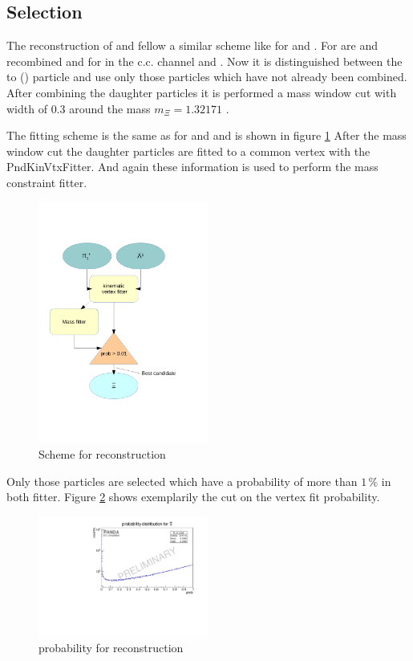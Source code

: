 	\subsection*{Selection}
		The reconstruction of \cascade and \anticascade fellow a similar scheme like for \lam and \alam.
		For \anticascade are \alam and \piplusone recombined and for \cascade in the c.c. channel \lam and \piminusone.
		Now it is distinguished between the to \piplus (\piminus) particle and use only those particles which have not already been combined.
		After combining the daughter particles it is performed a mass window cut with width of $0.3$\massunit 
		around the \cascade mass $m_{\Xi} = 1.32171$ \massunit \cite{PDG}.
		 
		The fitting scheme is the same as for \lam and \alam and is shown in figure \ref{fig:anticascade_scheme} 
		After the mass window cut the daughter particles are fitted to a common vertex with the PndKinVtxFitter.
		And again these information is used to perform the mass constraint fitter. 
		
		\begin{figure}
			\centering
				\includegraphics[width=0.50\textwidth]{./plots/combineAntiCascade.pdf}
			\caption{\propose Scheme for \anticascade reconstruction}
			\label{fig:anticascade_scheme}
		\end{figure}
		
		Only those particles are selected which have a \chisq probability of more than $1\,\%$ in both fitter. 
		Figure \ref{fig:XiPlus_prob} shows exemplarily the cut on the vertex fit probability.
		
		\begin{figure}
			\centering
				\includegraphics[width=0.50\textwidth]{./plots/Xi/XiPlus_prob.pdf}
			\caption{\propose \chisq probability for \anticascade reconstruction}
			\label{fig:XiPlus_prob}
		\end{figure}
			
